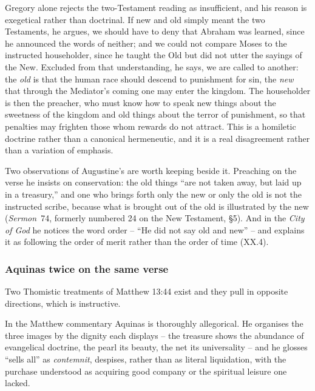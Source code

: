 Gregory alone rejects the two-Testament reading as insufficient, and his reason is exegetical rather than doctrinal. If new and old simply meant the two Testaments, he argues, we should have to deny that Abraham was learned, since he announced the words of neither; and we could not compare Moses to the instructed householder, since he taught the Old but did not utter the sayings of the New. Excluded from that understanding, he says, we are called to another: the \emph{old} is that the human race should descend to punishment for sin, the \emph{new} that through the Mediator's coming one may enter the kingdom. The householder is then the preacher, who must know how to speak new things about the sweetness of the kingdom and old things about the terror of punishment, so that penalties may frighten those whom rewards do not attract. This is a homiletic doctrine rather than a canonical hermeneutic, and it is a real disagreement rather than a variation of emphasis.

Two observations of Augustine's are worth keeping beside it. Preaching on the verse he insists on conservation: the old things ``are not taken away, but laid up in a treasury,'' and one who brings forth only the new or only the old is not the instructed scribe, because what is brought out of the old is illustrated by the new (\emph{Sermon}~74, formerly numbered 24 on the New Testament, §5). And in the \emph{City of God} he notices the word order -- ``He did not say old and new'' -- and explains it as following the order of merit rather than the order of time (XX.4).

\subsubsection*{Aquinas twice on the same verse}

Two Thomistic treatments of Matthew 13:44 exist and they pull in opposite directions, which is instructive.

In the Matthew commentary Aquinas is thoroughly allegorical. He organises the three images by the dignity each displays -- the treasure shows the abundance of evangelical doctrine, the pearl its beauty, the net its universality -- and he glosses ``sells all'' as \emph{contemnit}, despises, rather than as literal liquidation, with the purchase understood as acquiring good company or the spiritual leisure one lacked.

